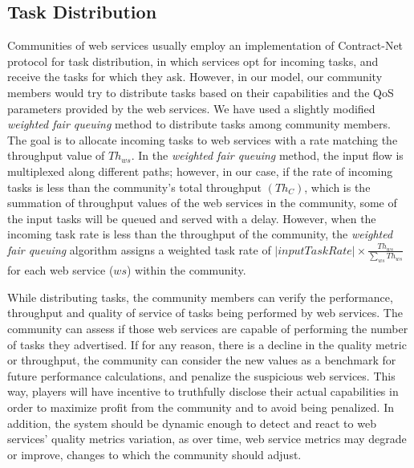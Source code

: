 \documentclass[10pt,journal,cspaper,compsoc]{IEEEtran}
\begin{document}
\subsection{Task Distribution}

Communities of web services usually employ an implementation of Contract-Net protocol for task distribution, in which services opt for incoming tasks, and receive the tasks for which they ask. However, in our model, our community members would try to distribute tasks based on their capabilities and the QoS parameters provided by the web services. We have used a slightly modified \emph{weighted fair queuing} method to distribute tasks among community members. The goal is to allocate incoming tasks to web services with a rate matching the throughput value of $Th_{ws}$. In the \emph{weighted fair queuing} method, the input flow is multiplexed along different paths; however, in our case, if the rate of incoming tasks is less than the community's total throughput $(Th_{C})$, which is the summation of throughput values of the web services in the community, some of the input tasks will be queued and served with a delay. 
However, when the incoming task rate is less than the throughput of the community, the \emph{weighted fair queuing} algorithm assigns a weighted task rate of $|input Task Rate| \times \frac{Th_{ws}}{\sum_{ws}{Th_{ws}}}$ for each web service ($ws$) within the community.

While distributing tasks, the community members can verify the performance, throughput and quality of service of tasks being performed by web services. The community can assess if those web services are capable of performing the number of tasks they advertised. If for any reason, there is a decline in the quality metric or throughput, the community can consider the new values as a benchmark for future performance calculations, and penalize the suspicious web services. This way, players will have incentive to truthfully disclose their actual capabilities in order to maximize profit from the community and to avoid being penalized. In addition, the system should be dynamic enough to detect and react to web services' quality metrics variation, as over time, web service metrics may degrade or improve, changes to which the community should adjust.
\end{document}

